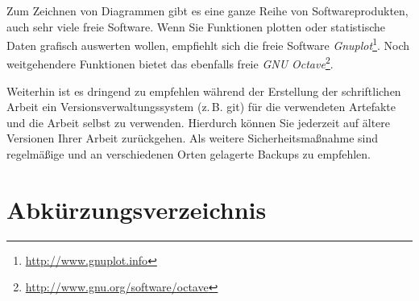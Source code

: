 \documentclass[a4paper,11pt,headings=normal]{scrartcl}
\begin{document}
Zum Zeichnen von Diagrammen gibt es eine ganze Reihe von Softwareprodukten, auch sehr viele freie Software. Wenn Sie Funktionen plotten oder statistische Daten grafisch auswerten wollen, empfiehlt sich die freie Software \textit{Gnuplot}\footnote{\url{http://www.gnuplot.info}}. Noch weitgehendere Funktionen bietet das ebenfalls freie \textit{GNU Octave}\footnote{\url{http://www.gnu.org/software/octave}}.

Weiterhin ist es dringend zu empfehlen während der Erstellung der schriftlichen Arbeit ein Versionsverwaltungssystem (z.\,B. git) für die verwendeten Artefakte und die Arbeit selbst zu verwenden. Hierdurch können Sie jederzeit auf ältere Versionen Ihrer Arbeit zurückgehen. Als weitere Sicherheitsmaßnahme sind regelmäßige und an verschiedenen Orten gelagerte Backups zu empfehlen.


\newpage
{}
\section*{Abkürzungsverzeichnis}

\begin{acronym}[IEEE]
\end{acronym}

\newpage
\listoftables
{}

\newpage
{}
\begingroup
\cleardoublepage
\begin{flushleft}
\let\clearpage\relax %
\printbibliography
\end{flushleft}
\endgroup

\printindex
{}
\end{document}
